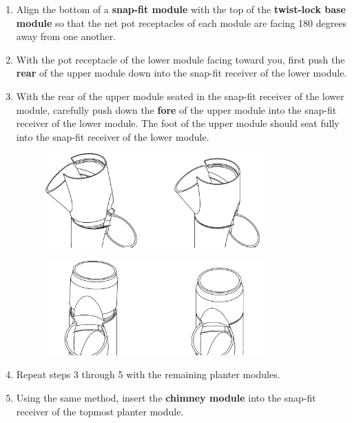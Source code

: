 \begin{enumerate}
\item Align the bottom of a \textbf{snap-fit module} with the top of the \textbf{twist-lock base module} so that the net pot receptacles of each module are facing 180 degrees away from one another.

\item With the pot receptacle of the lower module facing toward you, first push the \textbf{rear} of the upper module down into the snap-fit receiver of the lower module.

\item With the rear of the upper module seated in the snap-fit receiver of the lower module, carefully push down the \textbf{fore} of the upper module into the snap-fit receiver of the lower module. The foot of the upper module should seat fully into the snap-fit receiver of the lower module.

\begin{figure}[h]
    \centering
    \includegraphics[width=0.8\textwidth]{images/80mm/80mm_assembly_3.png}
    \caption*{}
    \label{fig:80mm-three}
\end{figure}
\begin{figure}[h!]
    \centering
    \includegraphics[width=0.8\textwidth]{images/80mm/80mm_assembly_4.png}
    \caption*{}
    \label{fig:80mm-four}
\end{figure}

\item Repeat steps 3 through 5 with the remaining planter modules.

\item Using the same method, insert the \textbf{chimney module} into the snap-fit receiver of the topmost planter module.


\end{enumerate}
